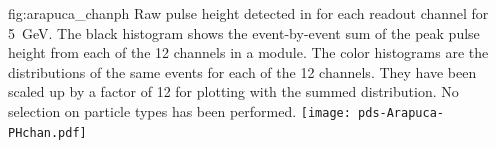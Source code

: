 
\begin{dunefigure}{fig:arapuca_chanph}
{Raw pulse height detected in  for each readout channel for \SI{5}{GeV}. The black histogram shows the event-by-event sum of the peak pulse height  from each of the \num{12}  channels in a module. The color histograms are the distributions of the same events for each of the \num{12} channels.  They have been scaled up by a factor of \num{12} for plotting with the summed distribution. No selection on particle types has been performed.}
\texttt{[image: pds-Arapuca-PHchan.pdf]}
\end{dunefigure}

